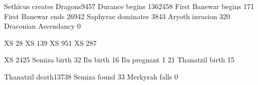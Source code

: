 \begin{comment}
\subsection{\FirstbanewarBook}
\end{comment}


           {Sethicus creates Dragons}{9457}
     {Durance begins}          {1362458}
       {First Banewar begins}    {171}
       {First Banewar ends}      {26942}
          {Saphyrae dominates}      {3843}
     {Aryoth invasion}         {320}
                       {Draconian Ascendancy}    {0}

      {XS}                  {28}
    {XS}                  {139}
       {XS}                  {951}
          {XS}                  {287}



\begin{comment}
\subsection{\ThanatzilBook}
\end{comment}

                 {XS}                  {2425}
                    {Semiza birth}        {32}
           {Ilu birth}           {16}
              {Ilu pregnant}        {1} {21}
 {Thanatzil birth}     {15}



\begin{comment}
\subsection{\MerkyrahBook}
\end{comment}

            {Thanatzil death}{13738}
          {Semiza found}   {33}
      {Merkyrah falls} {0}



